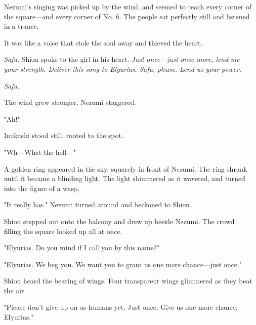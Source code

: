 Nezumi's singing was picked up by the wind, and seemed to reach every
corner of the square---and every corner of No. 6. The people sat perfectly
still and listened in a trance.

It was like a voice that stole the soul away and thieved the heart.

\emph{Safu.} Shion spoke to the girl in his heart. \emph{Just once---just once more,
lend me your strength. Deliver this song to Elyurias. Safu, please. Lend
us your power.}


\emph{Safu.}

The wind grew stronger. Nezumi staggered.

"Ah!"

Inukashi stood still, rooted to the spot.

"Wh---What the hell---"

A golden ring appeared in the sky, squarely in front of Nezumi. The ring
shrank until it became a blinding light. The light shimmered as it
wavered, and turned into the figure of a wasp.


"It really has." Nezumi turned around and beckoned to Shion.


Shion stepped out onto the balcony and drew up beside Nezumi. The crowd
filling the square looked up all at once.

"Elyurias. Do you mind if I call you by this name?"


"Elyurias. We beg you. We want you to grant us one more chance---just
once."

Shion heard the beating of wings. Four transparent wings glimmered as
they beat the air.

"Please don't give up on us humans yet. Just once. Give us one more
chance, Elyurias."


